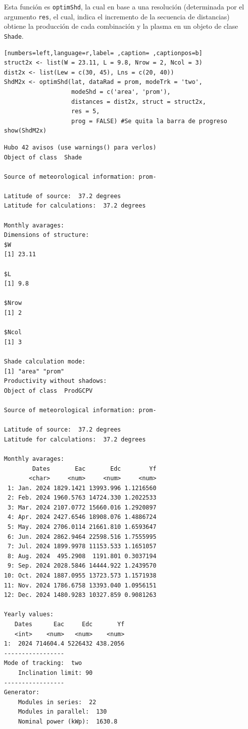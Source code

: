 Esta función es \texttt{optimShd}, la cual en base a una resolución (determinada por el argumento \texttt{res}, el cual, indica el incremento de la secuencia de distancias) obtiene la producción de cada combinación y la plasma en un objeto de clase \texttt{Shade}.
\begin{lstlisting}[numbers=left,language=r,label= ,caption= ,captionpos=b]
struct2x <- list(W = 23.11, L = 9.8, Nrow = 2, Ncol = 3)
dist2x <- list(Lew = c(30, 45), Lns = c(20, 40))
ShdM2x <- optimShd(lat, dataRad = prom, modeTrk = 'two',
                   modeShd = c('area', 'prom'),
                   distances = dist2x, struct = struct2x,
                   res = 5,
                   prog = FALSE) #Se quita la barra de progreso
show(ShdM2x)
\end{lstlisting}

\begin{verbatim}
Hubo 42 avisos (use warnings() para verlos)
Object of class  Shade 

Source of meteorological information: prom- 

Latitude of source:  37.2 degrees
Latitude for calculations:  37.2 degrees

Monthly avarages:
Dimensions of structure:
$W
[1] 23.11

$L
[1] 9.8

$Nrow
[1] 2

$Ncol
[1] 3

Shade calculation mode:
[1] "area" "prom"
Productivity without shadows:
Object of class  ProdGCPV 

Source of meteorological information: prom- 

Latitude of source:  37.2 degrees
Latitude for calculations:  37.2 degrees

Monthly avarages:
        Dates       Eac       Edc        Yf
       <char>     <num>     <num>     <num>
 1: Jan. 2024 1829.1421 13993.996 1.1216560
 2: Feb. 2024 1960.5763 14724.330 1.2022533
 3: Mar. 2024 2107.0772 15660.016 1.2920897
 4: Apr. 2024 2427.6546 18908.076 1.4886724
 5: May. 2024 2706.0114 21661.810 1.6593647
 6: Jun. 2024 2862.9464 22598.516 1.7555995
 7: Jul. 2024 1899.9978 11153.533 1.1651057
 8: Aug. 2024  495.2908  1191.801 0.3037194
 9: Sep. 2024 2028.5846 14444.922 1.2439570
10: Oct. 2024 1887.0955 13723.573 1.1571938
11: Nov. 2024 1786.6758 13393.040 1.0956151
12: Dec. 2024 1480.9283 10327.859 0.9081263

Yearly values:
   Dates      Eac     Edc       Yf
   <int>    <num>   <num>    <num>
1:  2024 714604.4 5226432 438.2056
-----------------
Mode of tracking:  two 
    Inclination limit: 90 
-----------------
Generator:
    Modules in series:  22 
    Modules in parallel:  130 
    Nominal power (kWp):  1630.8 


\end{verbatim}
